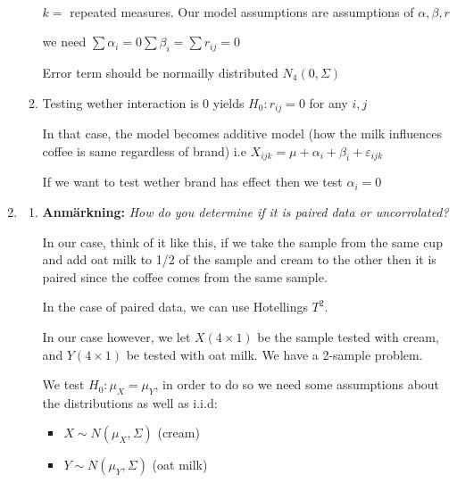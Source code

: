\begin{enumerate}[label=\arabic*.,leftmargin=*]
\begin{enumerate}[label=\alph*),leftmargin=*]
\begin{equation*}
\begin{gathered}
          \end{gathered}
        \end{equation*}
        \par\bigskip
        \noindent $k = $ repeated measures. Our model assumptions are assumptions of $\alpha,\beta,r$\par
        \noindent we need $\sum \alpha_i=0\sum\beta_i = \sum r_{ij}=0$\par
        \noindent Error term should be normailly distributed $N_4(0,\Sigma)$
        \par\bigskip
      \item Testing wether interaction is 0 yields $H_0:r_{ij}=0$ for any $i,j$\par
        \noindent In that case, the model becomes additive model (how the milk influences coffee is same regardless of brand) i.e $X_{ijk} = \mu+\alpha_i+\beta_i+\varepsilon_{ijk}$
        \par\bigskip
        \noindent If we want to test wether brand has effect then we test $\alpha_i=0$ 
    \end{enumerate}
    \item\par\bigskip
    \begin{enumerate}[label=\alph*),leftmargin=*]
      \item\noindent\textbf{Anmärkning:} \textit{How do you determine if it is paired data or uncorrolated?}
        \par\bigskip
        \noindent In our case, think of it like this, if we take the sample from the same cup and add oat milk to 1/2 of the sample and cream to the other then it is paired since the coffee comes from the same sample.
        \par\bigskip
        \noindent In the case of paired data, we can use Hotellings $T^2$.
        \par\bigskip
        \noindent In our case however, we let $X (4\times 1)$  be the sample tested with cream, and $Y (4\times 1)$ be tested with oat milk. We have a 2-sample problem.
        \par\bigskip
        We test $H_0:\mu_X = \mu_Y$, in order to do so we need some assumptions about the distributions as well as i.i.d:\par
        \begin{itemize}
          \item $X\sim N(\mu_X,\Sigma)$ (cream)
          \item $Y\sim N(\mu_Y,\Sigma)$ (oat milk)
        \end{itemize}

\end{enumerate}
\end{enumerate}

